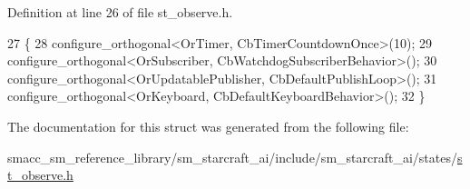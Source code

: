 Definition at line 26 of file st\+\_\+observe.\+h.


\begin{DoxyCode}
27     \{
28         configure\_orthogonal<OrTimer, CbTimerCountdownOnce>(10);
29         configure\_orthogonal<OrSubscriber, CbWatchdogSubscriberBehavior>();
30         configure\_orthogonal<OrUpdatablePublisher, CbDefaultPublishLoop>();
31         configure\_orthogonal<OrKeyboard, CbDefaultKeyboardBehavior>();
32     \}
\end{DoxyCode}


The documentation for this struct was generated from the following file\+:\begin{DoxyCompactItemize}
\item 
smacc\+\_\+sm\+\_\+reference\+\_\+library/sm\+\_\+starcraft\+\_\+ai/include/sm\+\_\+starcraft\+\_\+ai/states/\hyperlink{sm__starcraft__ai_2include_2sm__starcraft__ai_2states_2st__observe_8h}{st\+\_\+observe.\+h}\end{DoxyCompactItemize}
